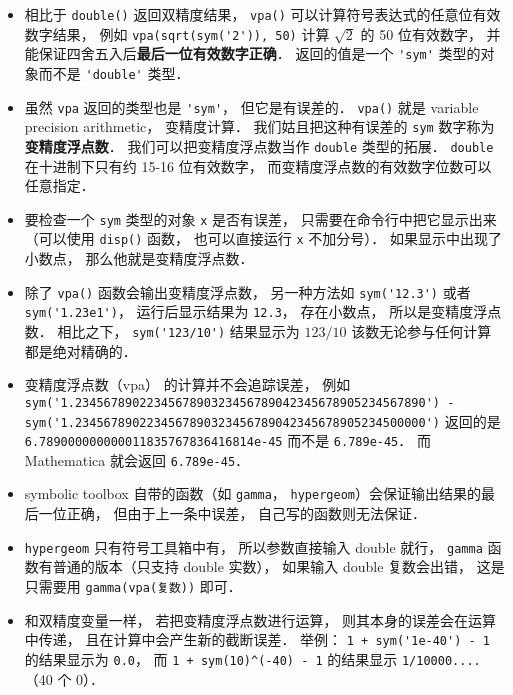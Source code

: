 \begin{itemize}
\item 相比于 \verb|double()| 返回双精度结果， \verb|vpa()| 可以计算符号表达式的任意位有效数字结果， 例如 \verb|vpa(sqrt(sym('2')), 50)| 计算 $\sqrt{2}$ 的 50 位有效数字， 并能保证四舍五入后\textbf{最后一位有效数字正确}． 返回的值是一个 \verb|'sym'| 类型的对象而不是 \verb|'double'| 类型．

\item 虽然 \verb|vpa| 返回的类型也是 \verb|'sym'|， 但它是有误差的． \verb|vpa()| 就是 variable precision arithmetic， 变精度计算． 我们姑且把这种有误差的 \verb|sym| 数字称为\textbf{变精度浮点数}． 我们可以把变精度浮点数当作 \verb|double| 类型的拓展． \verb|double| 在十进制下只有约 15-16 位有效数字， 而变精度浮点数的有效数字位数可以任意指定．

\item 要检查一个 \verb|sym| 类型的对象 \verb|x| 是否有误差， 只需要在命令行中把它显示出来（可以使用 \verb|disp()| 函数， 也可以直接运行 \verb|x| 不加分号）． 如果显示中出现了小数点， 那么他就是变精度浮点数．

\item 除了 \verb|vpa()| 函数会输出变精度浮点数， 另一种方法如 \verb|sym('12.3')| 或者 \verb|sym('1.23e1')|， 运行后显示结果为 \verb|12.3|， 存在小数点， 所以是变精度浮点数． 相比之下， \verb|sym('123/10')| 结果显示为 $123/10$ 该数无论参与任何计算都是绝对精确的．

\item 变精度浮点数（vpa） 的计算并不会追踪误差， 例如 \verb|sym('1.2345678902234567890323456789042345678905234567890') - sym('1.2345678902234567890323456789042345678905234500000')| 返回的是 \verb|6.789000000000011835767836416814e-45| 而不是 \verb|6.789e-45|． 而 Mathematica 就会返回 \verb|6.789e-45|．

\item symbolic toolbox 自带的函数（如 \verb|gamma|， \verb|hypergeom|）会保证输出结果的最后一位正确， 但由于上一条中误差， 自己写的函数则无法保证．

\item \verb|hypergeom| 只有符号工具箱中有， 所以参数直接输入 double 就行， \verb|gamma| 函数有普通的版本（只支持 double 实数）， 如果输入 double 复数会出错， 这是只需要用 \verb|gamma(vpa(复数))| 即可．

\item 和双精度变量一样， 若把变精度浮点数进行运算， 则其本身的误差会在运算中传递， 且在计算中会产生新的截断误差． 举例： \verb|1 + sym('1e-40') - 1| 的结果显示为 \verb|0.0|， 而 \verb|1 + sym(10)^(-40) - 1| 的结果显示 \verb|1/10000....|（40 个 0）．


\end{itemize}
